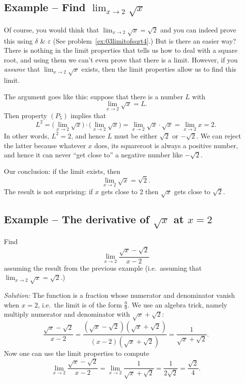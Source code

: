 \subsection{Example -- Find $\lim_{x\to 2}\sqrt x$}
\label{ex:limit-of-sqrt-at-2}

Of course, you would think that $\lim_{x\to 2}\sqrt x = \sqrt 2$ and
you can indeed prove this using $\delta$ \& $\varepsilon$ (See
problem~\ref{ex:03limitofsqrt4}.) But is there an easier way?  There
is nothing in the limit properties that tells us how to deal with a
square root, and using them we can't even prove that there is a limit.
However, if you \emph{assume} that $\lim_{x\to 2} \sqrt x$ exists,
then the limit properties allow us to find this limit.

The argument goes like this: suppose that there is a number $L$ with
\[
\lim_{x\to 2} \sqrt x = L.
\]
Then property $(P_5)$ implies that
\[
L^2 = \bigl(\lim_{x\to2}\sqrt x\bigr)\cdot\bigl(\lim_{x\to2}\sqrt x\bigr) =
\lim_{x\to2} \sqrt x\cdot \sqrt x =\lim_{x\to2}x =2.
\]
In other words, $L^2=2$, and hence $L$ must be either $\sqrt 2$ or $-\sqrt
2$.  We can reject the latter because whatever $x$ does, its squareroot is
always a positive number, and hence it can never ``get close to'' a
negative number like $-\sqrt 2$.


Our conclusion: if the limit exists, then
\[
\lim_{x\to2} \sqrt x = \sqrt 2.
\]
The result is not surprising: if $x$ gets close to 2 then $\sqrt x$ gets
close to $\sqrt 2$.


\subsection{Example -- The derivative of $\sqrt x$ at $x=2$}
Find
\[
\lim_{x\to2}\frac{\sqrt x-\sqrt2}{x-2}
\]
assuming the result from the previous example (i.e.~assuming that
$\lim_{x\to2}\sqrt x = \sqrt2$.)

\textit{Solution: } The function is a fraction whose numerator and
denominator vanish when $x=2$, i.e.\ the limit is of the form $\frac00$.
We use an algebra trick, namely multiply numerator and
denominator with $\sqrt{x}+\sqrt{2}$:
\[
\frac{\sqrt x-\sqrt2}{x-2}
= \frac{(\sqrt x-\sqrt2)(\sqrt{x}+\sqrt{2})}{(x-2)(\sqrt
  x+\sqrt2)} =\frac{1}{\sqrt x+\sqrt2}.
\]
Now one can use the limit properties to compute
\[
\lim_{x\to2} \frac{\sqrt x-\sqrt 2}{x-2} = \lim_{x\to2} \frac{1}{\sqrt
  x+\sqrt 2} =\frac1{2\sqrt2} =\frac{\sqrt2}4.
\]




